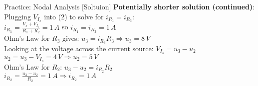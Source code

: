 \begin{frame}{Practice: Nodal Analysis [Soltuion]}
    \color{blue}
    \textbf{Potentially shorter solution (continued)}: \\[5pt]
    Plugging $V_{I_s}$ into (2) to solve for $i_{R_1} = i_{R_3}$: \\[3pt]
    $i_{R_1} = \frac{V_s + V_{I_s}}{R_1 + R_2} = 1\, A$ so $\boxed{i_{R_1} = i_{R_3} = 1\,A}$ \\[5pt]
    Ohm's Law for $R_3$ gives: $u_3 = i_{R_3} R_3 \Rightarrow \boxed{u_3 = 8\,V}$ \\[5pt]
    Looking at the voltage across the current source: $V_{I_s} = u_3 - u_2$ \\
    $u_2 = u_3 - V_{I_s} = 4\,V \Rightarrow \boxed{u_2 = 5\,V}$ \\[5pt]
    Ohm's Law for $R_2$: $u_3 - u_2 = i_{R_2} R_2$ \\[3pt]
    $i_{R_2} = \frac{u_3 - u_2}{R_2} = 1\,A \Rightarrow \boxed{i_{R_2} = 1\,A}$
\end{frame}